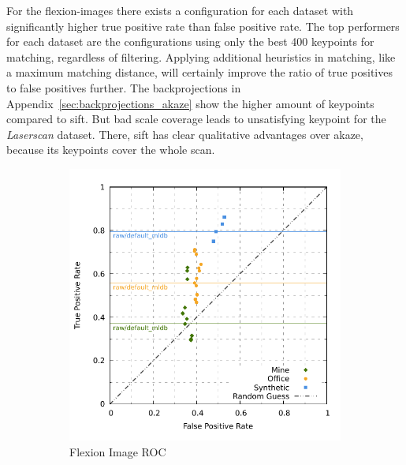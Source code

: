 For the \glspl{flexion-image} there exists a configuration for each dataset with significantly higher true positive rate than false positive rate.
The top performers for each dataset are the configurations using only the best 400 keypoints for matching, regardless of filtering.
Applying additional heuristics in matching, like a maximum matching distance, will certainly improve the ratio of true positives to false positives further.
The backprojections in Appendix~\ref{sec:backprojections_akaze} show the higher amount of keypoints compared to \acrshort{sift}.
But bad scale coverage leads to unsatisfying keypoint for the \emph{Laserscan} dataset.
There, \acrshort{sift} has clear qualitative advantages over \acrshort{akaze}, because its keypoints cover the whole scan.
\begin{figure}[htp]
\begin{subfigure}[t]{0.45\linewidth}
    \includegraphics[width=\linewidth]{chapter06/results/AKAZE/flexion/roc.pdf}%
    \caption{Flexion Image ROC}
\end{subfigure}\quad
\begin{subfigure}[t]{0.45\linewidth}

\end{subfigure}
\end{figure}
